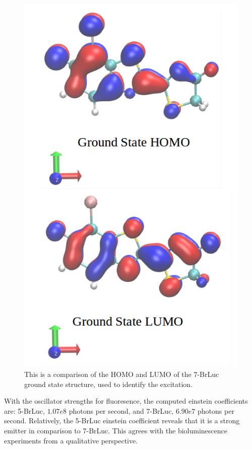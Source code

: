 \documentclass[11pt]{article}
\begin{document}
\begin{figure}[H]
  \centering
  \includegraphics[scale=0.2]{7brluc_ex_gs.png}
  \caption{This is a comparison of the HOMO and LUMO of the
    7-BrLuc ground state structure, used to identify the
    excitation.}
  \label{fig:comp_7brLuc}
\end{figure}

With the oscillator strengths for fluoresence, the computed
einstein coefficients are: 5-BrLuc, $1.07e8$ photons per second,
and 7-BrLuc, $6.90e7$ photons per second. Relatively, the 5-BrLuc
einstein coefficient reveals that it is a strong emitter in comparison
to 7-BrLuc. This agrees with the bioluminescence
experiments\cite{doi:10.1002/cbic.201600564} from
a qualitative perspective.
\end{document}
